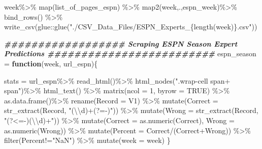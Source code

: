 \documentclass[
]{article}
\newenvironment{Shaded}{\begin{snugshade}}{\end{snugshade}}
\newcommand{\AttributeTok}[1]{\textcolor[rgb]{0.77,0.63,0.00}{#1}}
\newcommand{\ConstantTok}[1]{\textcolor[rgb]{0.00,0.00,0.00}{#1}}
\newcommand{\ControlFlowTok}[1]{\textcolor[rgb]{0.13,0.29,0.53}{\textbf{#1}}}
\newcommand{\DecValTok}[1]{\textcolor[rgb]{0.00,0.00,0.81}{#1}}
\newcommand{\DocumentationTok}[1]{\textcolor[rgb]{0.56,0.35,0.01}{\textbf{\textit{#1}}}}
\newcommand{\FunctionTok}[1]{\textcolor[rgb]{0.00,0.00,0.00}{#1}}
\newcommand{\NormalTok}[1]{#1}
\newcommand{\OtherTok}[1]{\textcolor[rgb]{0.56,0.35,0.01}{#1}}
\newcommand{\SpecialCharTok}[1]{\textcolor[rgb]{0.00,0.00,0.00}{#1}}
\newcommand{\StringTok}[1]{\textcolor[rgb]{0.31,0.60,0.02}{#1}}
\begin{document}
\begin{Shaded}
\begin{Highlighting}[]
\NormalTok{week}\SpecialCharTok{\%\textgreater{}\%}
  \FunctionTok{map}\NormalTok{(list\_of\_pages\_espn) }\SpecialCharTok{\%\textgreater{}\%} 
  \FunctionTok{map2}\NormalTok{(week,.,espn\_week)}\SpecialCharTok{\%\textgreater{}\%}
  \FunctionTok{bind\_rows}\NormalTok{() }\SpecialCharTok{\%\textgreater{}\%} 
  \FunctionTok{write\_csv}\NormalTok{(glue}\SpecialCharTok{::}\FunctionTok{glue}\NormalTok{(}\StringTok{"./CSV\_Data\_Files/ESPN\_Experts\_\{length(week)\}.csv"}\NormalTok{))}

\DocumentationTok{\#\#\#\#\#\#\#\#\#\#\#\#\#\#\#\#\#\# Scraping ESPN Season Expert Predictions \#\#\#\#\#\#\#\#\#\#\#\#\#\#\#\#\#\#\#\#\#\#\#\#\#}
\NormalTok{espn\_season }\OtherTok{=} \ControlFlowTok{function}\NormalTok{(week, url\_espn)\{}
  
\NormalTok{  stats }\OtherTok{=}\NormalTok{ url\_espn}\SpecialCharTok{\%\textgreater{}\%}
    \FunctionTok{read\_html}\NormalTok{()}\SpecialCharTok{\%\textgreater{}\%}
    \FunctionTok{html\_nodes}\NormalTok{(}\StringTok{".wrap{-}cell span+ span"}\NormalTok{)}\SpecialCharTok{\%\textgreater{}\%}
    \FunctionTok{html\_text}\NormalTok{() }\SpecialCharTok{\%\textgreater{}\%} 
    \FunctionTok{matrix}\NormalTok{(}\AttributeTok{ncol =} \DecValTok{1}\NormalTok{, }\AttributeTok{byrow =} \ConstantTok{TRUE}\NormalTok{) }\SpecialCharTok{\%\textgreater{}\%}
    \FunctionTok{as.data.frame}\NormalTok{()}\SpecialCharTok{\%\textgreater{}\%}
    \FunctionTok{rename}\NormalTok{(}\StringTok{\textasciigrave{}}\AttributeTok{Record}\StringTok{\textasciigrave{}} \OtherTok{=}\NormalTok{ V1) }\SpecialCharTok{\%\textgreater{}\%} 
    \FunctionTok{mutate}\NormalTok{(}\AttributeTok{Correct =} \FunctionTok{str\_extract}\NormalTok{(Record, }\StringTok{"(}\SpecialCharTok{\textbackslash{}\textbackslash{}}\StringTok{d)+(?={-})"}\NormalTok{)) }\SpecialCharTok{\%\textgreater{}\%} 
    \FunctionTok{mutate}\NormalTok{(}\AttributeTok{Wrong =} \FunctionTok{str\_extract}\NormalTok{(Record, }\StringTok{"(?\textless{}={-})(}\SpecialCharTok{\textbackslash{}\textbackslash{}}\StringTok{d)+"}\NormalTok{)) }\SpecialCharTok{\%\textgreater{}\%} 
    \FunctionTok{mutate}\NormalTok{(}\AttributeTok{Correct =} \FunctionTok{as.numeric}\NormalTok{(Correct), }\AttributeTok{Wrong =} \FunctionTok{as.numeric}\NormalTok{(Wrong)) }\SpecialCharTok{\%\textgreater{}\%} 
    \FunctionTok{mutate}\NormalTok{(}\AttributeTok{Percent =}\NormalTok{ Correct}\SpecialCharTok{/}\NormalTok{(Correct}\SpecialCharTok{+}\NormalTok{Wrong)) }\SpecialCharTok{\%\textgreater{}\%} 
    \FunctionTok{filter}\NormalTok{(Percent}\SpecialCharTok{!=}\StringTok{"NaN"}\NormalTok{) }\SpecialCharTok{\%\textgreater{}\%} 
    \FunctionTok{mutate}\NormalTok{(}\AttributeTok{week =}\NormalTok{ week)}
\NormalTok{\}}


\end{Highlighting}
\end{Shaded}
\end{document}
